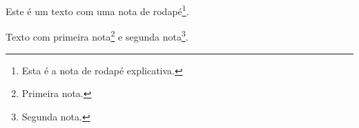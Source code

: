 
Este é um texto com uma nota de rodapé\footnote{Esta é a nota de rodapé explicativa.}.

Texto com primeira nota\footnote{Primeira nota.} e segunda nota\footnote{Segunda nota.}.







